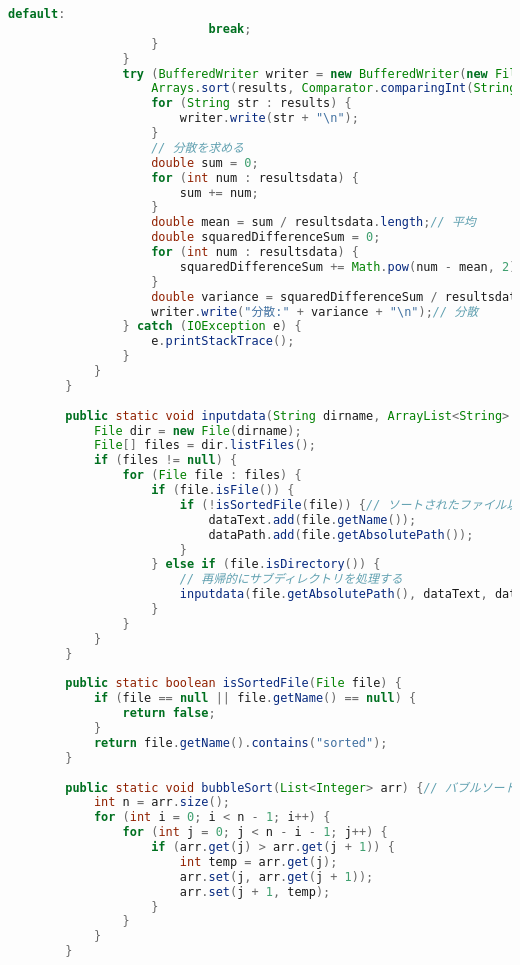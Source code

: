 \documentclass{jsarticle}
\begin{document}
\begin{lstlisting}[label=code:in, language=java]
                        default:
                            break;
                    }
                }
                try (BufferedWriter writer = new BufferedWriter(new FileWriter("result.txt", true))) {
                    Arrays.sort(results, Comparator.comparingInt(String::length));
                    for (String str : results) {
                        writer.write(str + "\n");
                    }
                    // 分散を求める
                    double sum = 0;
                    for (int num : resultsdata) {
                        sum += num;
                    }
                    double mean = sum / resultsdata.length;// 平均
                    double squaredDifferenceSum = 0;
                    for (int num : resultsdata) {
                        squaredDifferenceSum += Math.pow(num - mean, 2);
                    }
                    double variance = squaredDifferenceSum / resultsdata.length;
                    writer.write("分散:" + variance + "\n");// 分散
                } catch (IOException e) {
                    e.printStackTrace();
                }
            }
        }
    
        public static void inputdata(String dirname, ArrayList<String> dataText, ArrayList<String> dataPath) {// ディレクトリの中にあるデータをdataTextに格納
            File dir = new File(dirname);
            File[] files = dir.listFiles();
            if (files != null) {
                for (File file : files) {
                    if (file.isFile()) {
                        if (!isSortedFile(file)) {// ソートされたファイル以外を格納
                            dataText.add(file.getName());
                            dataPath.add(file.getAbsolutePath());
                        }
                    } else if (file.isDirectory()) {
                        // 再帰的にサブディレクトリを処理する
                        inputdata(file.getAbsolutePath(), dataText, dataPath);
                    }
                }
            }
        }
    
        public static boolean isSortedFile(File file) {
            if (file == null || file.getName() == null) {
                return false;
            }
            return file.getName().contains("sorted");
        }
    
        public static void bubbleSort(List<Integer> arr) {// バブルソート
            int n = arr.size();
            for (int i = 0; i < n - 1; i++) {
                for (int j = 0; j < n - i - 1; j++) {
                    if (arr.get(j) > arr.get(j + 1)) {
                        int temp = arr.get(j);
                        arr.set(j, arr.get(j + 1));
                        arr.set(j + 1, temp);
                    }
                }
            }
        }
    

\end{lstlisting}
\end{document}
